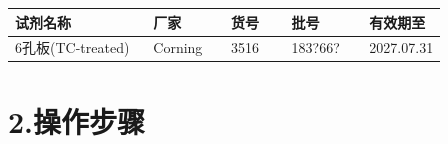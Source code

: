 \documentclass[UTF8,10pt,a4paper,fontset=fandol]{ctexart}
\newcommand{\fieldvalue}[1]{#1}
\newcommand{\handwritten}[1]{#1}
\begin{document}
\begin{center}
\begin{tabular}{|p{0.32\linewidth}|p{0.18\linewidth}|p{0.14\linewidth}|p{0.18\linewidth}|p{0.18\linewidth}|}
\hline
试剂名称 & 厂家 & 货号 & 批号 & 有效期至 \\ \hline
6孔板(TC-treated) & Corning & 3516 &
\fieldvalue{\handwritten{183?66?}} &
\fieldvalue{\handwritten{2027.07.31}}
\\ \hline
\end{tabular}
\end{center}

\section*{2.\quad 操作步骤}
\end{document}
